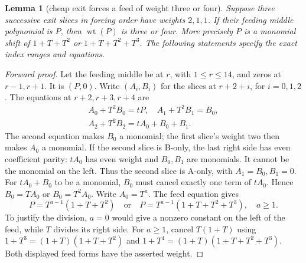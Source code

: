 \documentclass{article}
\newtheorem{lemma}{Lemma}
\DeclareMathOperator{\wt}{wt}
\begin{document}
\begin{lemma}[cheap exit forces a feed of weight three or four]\label{lem:cheap-exit}
  Suppose three successive exit slices in forcing order have weights \(2, 1, 1\). If their feeding
  middle polynomial is \(P\), then \(\wt(P)\) is three or four. More precisely \(P\) is a monomial
  shift of \(1 + T + T^2\) or \(1 + T + T^2 + T^3\). The following statements specify the exact
  index ranges and equations.
\end{lemma}

\begin{proof}[Forward proof]
  Let the feeding middle be at \(r\), with \(1 \le r \le 14\), and zeros at \(r - 1, r + 1\). It
  is \((P, 0)\). Write \((A_i, B_i)\) for the slices at \(r + 2 + i\), for \(i = 0, 1, 2\). The
  equations at \(r + 2, r + 3, r + 4\) are
  \begin{equation}\label{eq:cheap-forward}
    \begin{gathered}
      A_0 + T^2 B_0 = tP, \quad A_1 + T^2 B_1 = B_0, \\
      A_2 + T^2 B_2 = t A_0 + B_0 + B_1.
    \end{gathered}
  \end{equation}
  The second equation makes \(B_0\) a monomial; the first slice's weight two then makes \(A_0\) a
  monomial. If the second slice is B-only, the last right side has even coefficient parity:
  \(t A_0\) has even weight and \(B_0, B_1\) are monomials. It cannot be the monomial on the left.
  Thus the second slice is A-only, with \(A_1 = B_0, B_1 = 0\). For \(t A_0 + B_0\) to be a
  monomial, \(B_0\) must cancel exactly one term of \(t A_0\). Hence \(B_0 = T A_0\) or
  \(B_0 = T^2 A_0\). Write \(A_0 = T^a\). The feed equation gives
  \begin{equation}
    P = T^{a-1}(1 + T + T^2) \quad \text{or} \quad
    P = T^{a-1}(1 + T + T^2 + T^3), \quad a \ge 1.
  \end{equation}
  To justify the division, \(a = 0\) would give a nonzero constant on the left of the feed, while
  \(T\) divides its right side. For \(a \ge 1\), cancel \(T(1 + T)\) using
  \(1 + T^3 = (1 + T)(1 + T + T^2)\) and \(1 + T^4 = (1 + T)(1 + T + T^2 + T^3)\). Both displayed
  feed forms have the asserted weight.
\end{proof}
\end{document}
